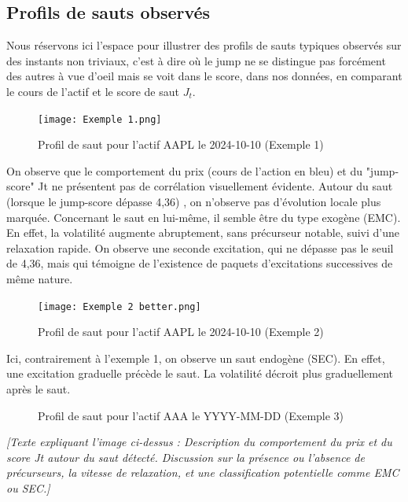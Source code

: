\documentclass[10pt,a4paper]{article}
\theoremstyle{definition}
\theoremstyle{remark}
\begin{document}
\begin{itemize}
    \subsection{Profils de sauts observés}

    Nous réservons ici l'espace pour illustrer des profils de sauts typiques observés sur des instants non triviaux, c'est à dire où le jump ne se distingue pas forcément des autres à vue d'oeil mais se voit dans le score, dans nos données, en comparant le cours de l'actif et le score de saut $J_t$.

    \begin{figure}[H]
        \centering
        \texttt{[image: Exemple 1.png]}
        \caption{Profil de saut pour l'actif AAPL le 2024-10-10 (Exemple 1)}
        \label{fig:jump_example_1}
    \end{figure}
    
    On observe que le comportement du prix (cours de l'action en bleu) et du "jump-score" Jt ne présentent pas de corrélation visuellement évidente. Autour du saut (lorsque le jump-score dépasse 4,36) , on n'observe pas d'évolution locale plus marquée. Concernant le saut en lui-même, il semble être du type exogène (EMC). En effet, la volatilité augmente abruptement, sans précurseur notable, suivi d'une relaxation rapide. On observe une seconde excitation, qui ne dépasse pas le seuil de 4,36, mais qui témoigne de l'existence de paquets d'excitations successives de même nature. 

    \vspace{1cm}

    \begin{figure}[H]
        \centering
        \texttt{[image: Exemple 2 better.png]}
        \caption{Profil de saut pour l'actif AAPL le 2024-10-10 (Exemple 2)}
        \label{fig:jump_example_2}
    \end{figure}

    Ici, contrairement à l'exemple 1, on observe un saut endogène (SEC). En effet, une excitation graduelle précède le saut. La volatilité décroit plus graduellement après le saut. 
    

    \vspace{1cm}

    \begin{figure}[H]
        \centering
        \fbox{\rule{0pt}{4cm}\qquad\rule{8cm}{0pt}} %
        \caption{Profil de saut pour l'actif AAA le YYYY-MM-DD (Exemple 3)}
        \label{fig:jump_example_3}
    \end{figure}
    \textit{[Texte expliquant l'image ci-dessus : Description du comportement du prix et du score Jt autour du saut détecté. Discussion sur la présence ou l'absence de précurseurs, la vitesse de relaxation, et une classification potentielle comme EMC ou SEC.]}


\end{itemize}
\end{document}
